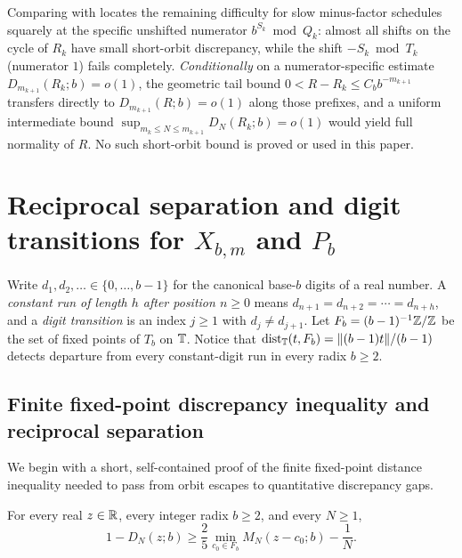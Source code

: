\documentclass[11pt]{article}
\newcommand{\dist}[1]{\lVert #1\rVert}
\begin{document}
\begin{remark}\label{rem:conditional-short}
Comparing  with  locates the remaining difficulty for slow minus-factor schedules squarely at the specific unshifted numerator $b^{S_k}\bmod Q_k$: almost all shifts on the cycle of $R_k$ have small short-orbit discrepancy, while the shift $-S_k\bmod T_k$ (numerator $1$) fails completely. \emph{Conditionally} on a numerator-specific estimate $D_{m_{k+1}}(R_k;b)=o(1)$, the geometric tail bound $0<R-R_k\le C_b b^{-m_{k+1}}$ transfers directly to $D_{m_{k+1}}(R;b)=o(1)$ along those prefixes, and a uniform intermediate bound $\sup_{m_k\le N\le m_{k+1}}D_N(R_k;b)=o(1)$ would yield full normality of $R$. No such short-orbit bound is proved or used in this paper.
\end{remark}

\section{Reciprocal separation and digit transitions for \texorpdfstring{$X_{b,m}$ and $P_b$}{X(b,m) and P(b)}}\label{sec:partitions}

Write $d_1,d_2,\dots\in\{0,\dots,b-1\}$ for the canonical base-$b$ digits of a real number. A \emph{constant run of length $h$ after position $n\ge0$} means $d_{n+1}=d_{n+2}=\cdots=d_{n+h}$, and a \emph{digit transition} is an index $j\ge1$ with $d_j\ne d_{j+1}$. Let $F_b=(b-1)^{-1}\mathbb Z/\mathbb Z$ be the set of fixed points of $T_b$ on $\mathbb T$. Notice that $\operatorname{dist}_{\T}(t,F_b)=\dist{(b-1)t}/(b-1)$ detects departure from every constant-digit run in every radix $b\ge2$.

\subsection{Finite fixed-point discrepancy inequality and reciprocal separation}

We begin with a short, self-contained proof of the finite fixed-point distance inequality needed to pass from orbit escapes to quantitative discrepancy gaps.

\begin{lemma}\label{lem:fixed-gap}
For every real $z\in\mathbb R$, every integer radix $b\ge2$, and every $N\ge1$,
\begin{equation}\label{eq:fixed-gap}
1-D_N(z;b)\ge\frac25\min_{c_0\in F_b}M_N(z-c_0;b)-\frac1N.
\end{equation}
\end{lemma}
\end{document}
